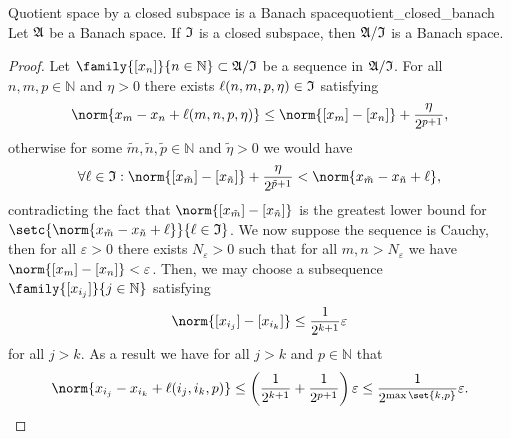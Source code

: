 \begin{lemma}{Quotient space by a closed subspace is a Banach space}{quotient_closed_banach}
    Let \(\mathfrak{A}\) be a Banach space. If \(\mathfrak{I}\) is a closed subspace, then \(\mathfrak{A}/\mathfrak{I}\) is a Banach space.
\end{lemma}
\begin{proof}
    Let \(\family{[x_n]}{n \in \mathbb{N}} \subset \algebra{A}/\algebra{I}\) be a sequence in \(\mathfrak{A}/\mathfrak{I}\). For all \(n,m,p \in \mathbb{N}\) and \(\eta > 0\) there exists \(\ell(n,m,p, \eta) \in \mathfrak{I}\) satisfying
    \begin{equation*}
        \norm{x_m - x_n + \ell(m,n,p,\eta)} \leq \norm{[x_m] - [x_n]} + \frac{\eta}{2^{p+1}},
    \end{equation*}
    otherwise for some \(\tilde{m}, \tilde{n}, \tilde{p} \in \mathbb{N}\) and \(\tilde{\eta} > 0\) we would have
    \begin{equation*}
        \forall \ell \in \algebra{I}: \norm{[x_{\tilde{m}}] - [x_{\tilde{n}}]} + \frac{\eta}{2^{\tilde{p} + 1}} < \norm{x_{\tilde{m}} - x_{\tilde{n}} + \ell},
    \end{equation*}
    contradicting the fact that \(\norm{[x_{\tilde{m}}] - [x_{\tilde{n}}]}\) is the greatest lower bound for \(\setc{\norm{x_{\tilde{m}} - x_{\tilde{n}} + \ell}}{\ell \in \algebra{I}}\).
    We now suppose the sequence is Cauchy, then for all \(\varepsilon> 0\) there exists \(N_{\varepsilon} > 0\) such that for all \(m, n > N_{\varepsilon}\) we have \(\norm{[x_m] - [x_n]} < \varepsilon\). Then, we may choose a subsequence \(\family{[x_{i_j}]}{j \in \mathbb{N}}\) satisfying
    \begin{equation*}
        \norm{[x_{i_j}] - [x_{i_k}]} \leq \frac{1}{2^{k+1}}\varepsilon
    \end{equation*}
    for all \(j > k\). As a result we have for all \(j > k\) and \(p \in \mathbb{N}\) that
    \begin{equation*}
        \norm{x_{i_j} - x_{i_k} + \ell(i_j, i_k, p)} \leq \left(\frac{1}{2^{k+1}} + \frac{1}{2^{p+1}}\right)\varepsilon \leq \frac{1}{2^{\max\set{k,p}}}\varepsilon.
    \end{equation*}


\end{proof}
